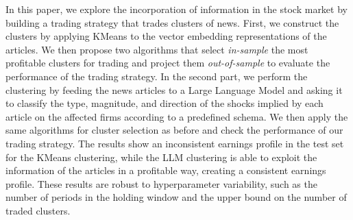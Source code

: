 
In this paper, we explore the incorporation of information in the stock market by building a trading strategy that trades clusters of news. First, we construct the clusters by applying KMeans to the vector embedding representations of the articles. We then propose two algorithms that select \textit{in-sample} the most profitable clusters for trading and project them \textit{out-of-sample} to evaluate the performance of the trading strategy. 
In the second part, we perform the clustering by feeding the news articles to a Large Language Model and asking it to classify the type, magnitude, and direction of the shocks implied by each article on the affected firms according to a predefined schema. We then apply the same algorithms for cluster selection as before and check the performance of our trading strategy.
%
The results show an inconsistent earnings profile in the test set for the KMeans clustering, while the LLM clustering is able to exploit the information of the articles in a profitable way, creating a consistent earnings profile. These results are robust to hyperparameter variability, such as the number of periods in the holding window and the upper bound on the number of traded clusters. 


